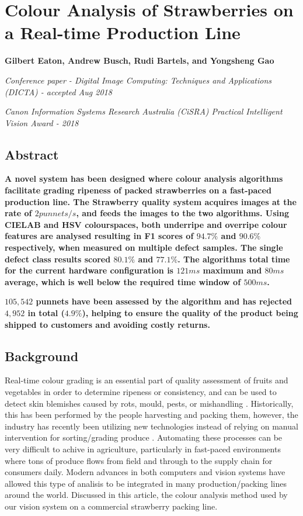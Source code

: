 \documentclass[fleqn,twoside,12pt]{report}
\begin{document}
\newpage
\chapter{Colour Analysis of Strawberries on a Real-time Production Line}
\label{sec:paper_2}

\textbf{Gilbert Eaton, Andrew Busch, Rudi Bartels, and Yongsheng Gao}

\textit{Conference paper - Digital Image Computing: Techniques and Applications (DICTA) - accepted Aug 2018}

\textit{Canon Information Systems Research Australia (CiSRA) Practical Intelligent Vision Award - 2018}


\section{Abstract}

\textbf{A novel system has been designed where colour analysis algorithms facilitate grading ripeness of packed strawberries on a fast-paced production line. The Strawberry quality system acquires images at the rate of $2 punnets/s$, and feeds the images to the two algorithms. Using CIELAB and HSV colourspaces, both underripe and overripe colour features are analysed  resulting in F1 scores of $94.7\%$ and $90.6\%$ respectively, when measured on multiple defect samples. The single defect class results scored $80.1\%$ and $77.1\%$. The algorithms total time for the current hardware configuration is $121ms$ maximum and $80ms$ average, which is well below the required time window of $500ms$.}
	
\textbf{$105,542$ punnets have been assessed by the algorithm and has rejected $4,952$ in total ($4.9\%$),  helping to ensure the quality of the product being shipped to customers and avoiding costly returns.}


\section{Background}

Real-time colour grading is an essential part of quality assessment of fruits and vegetables in order to determine ripeness or consistency, and can be used to detect skin blemishes caused by rots, mould, pests, or mishandling \cite{blasco3}. Historically, this has been performed by the people harvesting and packing them, however, the industry has recently been utilizing new technologies instead of relying on manual intervention for sorting/grading produce \cite{londhe}. Automating these processes can be very difficult to achive in agriculture, particularly in fast-paced environments where tons of produce flows from field and through to the supply chain for consumers daily. Modern advances in both computers and vision systems have allowed this type of analisis to be integrated in many production/packing lines around the world. Discussed in this article, the colour analysis method used by our vision system on a commercial strawberry packing line.
\end{document}
